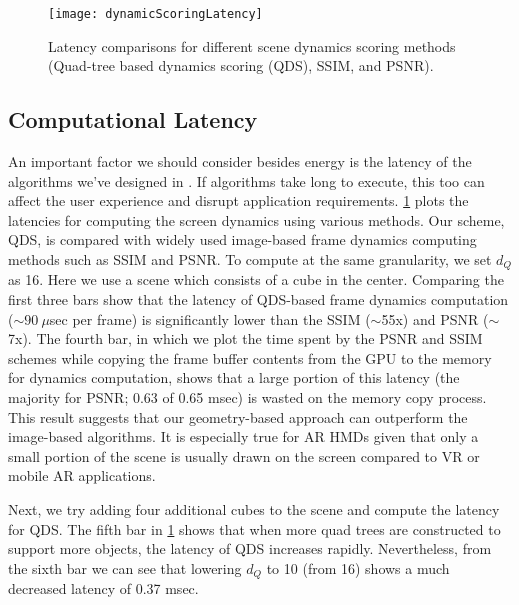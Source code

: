 
\begin{figure}[t]
    \centering
    \vspace{-1ex}
    \texttt{[image: dynamicScoringLatency]}
    \vspace{-2ex}
    \caption{Latency comparisons for different scene dynamics scoring methods
            (Quad-tree based dynamics scoring (QDS), SSIM, and PSNR).}
    \label{fig:dynamicScoringLatency}
\end{figure}


\subsection{Computational Latency}


An important factor we should consider besides energy is the latency of the 
algorithms we've designed in {\myit}. If algorithms take long to execute, 
this too can affect the user experience and disrupt application requirements.
%
\fig\ref{fig:dynamicScoringLatency} plots the latencies for computing the 
screen dynamics using various methods. Our scheme, QDS, is compared with 
widely used image-based frame dynamics computing methods such as SSIM and PSNR.
%
To compute at the same granularity, we set $d_Q$ as 16. Here we use a scene 
which consists of a cube in the center. Comparing the first three bars show 
that the latency of QDS-based frame dynamics computation ($\sim90~\mu$sec per frame)
is significantly lower than the SSIM ($\sim$55x) and PSNR ($\sim$7x).
%
The fourth bar, in which we plot the time spent by the PSNR and SSIM schemes 
while copying the frame buffer contents from the GPU to the memory for dynamics 
computation, shows that a large portion of this latency (the majority for 
PSNR; 0.63 of 0.65 msec) is wasted on the memory copy process.
%
This result suggests that our geometry-based approach can
outperform the image-based algorithms. It is especially true for
AR HMDs given that only a small portion of the scene is usually drawn
on the screen compared to VR or mobile AR applications. 


Next, we try adding four additional cubes to the scene and compute the latency
for QDS. The fifth bar in \fig\ref{fig:dynamicScoringLatency} shows that when
more quad trees are constructed to support more objects, the latency of QDS 
increases rapidly.
Nevertheless, from the sixth bar we can see that lowering $d_Q$ to 10 (from 16)
shows a much decreased latency of 0.37 msec.

